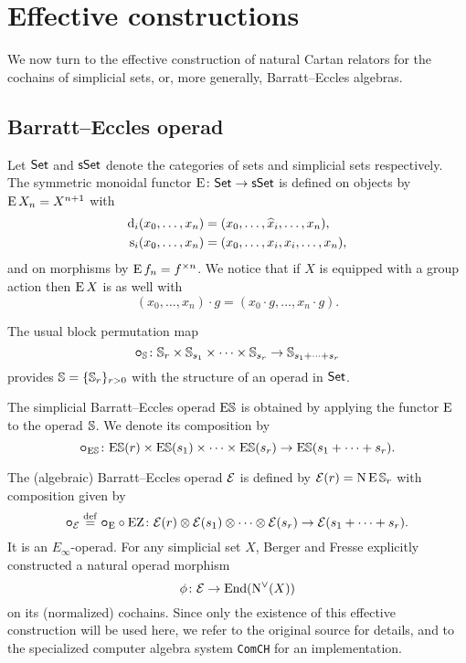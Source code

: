 
\section{Effective constructions}\label{s:effective}

We now turn to the effective construction of natural Cartan relators for the cochains of simplicial sets, or, more generally, Barratt--Eccles algebras.

\subsection{Barratt--Eccles operad}

Let $\mathsf{Set}$ and $\mathsf{sSet}$ denote the categories of sets and simplicial sets respectively.
The symmetric monoidal functor $\operatorname{E} \colon \mathsf{Set} \to \mathsf{sSet}$ is defined on objects by $\operatorname{E} X_n = X^{n+1}$ with
\[
\begin{split}
	\operatorname{d}_i(x_0,\dots,x_n) &= (x_0,\dots,\widehat{x}_i,\dots,x_n), \\
	\operatorname{s}_i(x_0,\dots,x_n) &= (x_0, \dots, x_i, x_i, \dots, x_n),
\end{split}
\]
and on morphisms by $\operatorname{E} f_n = f^{\times n}$.
We notice that if $X$ is equipped with a group action then $\operatorname{E} X$ is as well with
\[
(x_0,\dots,x_n) \cdot g = (x_0 \cdot g, \dots, x_n \cdot g).
\]

The usual block permutation map
\[
\bm{\circ}_{\mathbb{S}} \colon \mathbb{S}_r \times \mathbb{S}_{s_1} \times \cdots \times \mathbb{S}_{s_r} \to \mathbb{S}_{s_1+\dots+s_r}
\]
provides $\mathbb{S} = \{\mathbb{S}_r\}_{r>0}$ with the structure of an operad in $\mathsf{Set}$.

The simplicial Barratt--Eccles operad $\mathrm{E}\mathbb{S}$ is obtained by applying the functor $\operatorname{E}$ to the operad $\mathbb{S}$.
We denote its composition by
\[
\bm{\circ}_{\mathrm{E}\mathbb{S}} \colon
\mathrm{E}\mathbb{S}(r) \times \mathrm{E}\mathbb{S}(s_1) \times\dots\times \mathrm{E}\mathbb{S}(s_r) \to
\mathrm{E}\mathbb{S}(s_1+\dots+s_r).
\]

The (algebraic) Barratt--Eccles operad $\mathcal{E}$ is defined by $\mathcal{E}(r) = \operatorname{N}\operatorname{E}\mathbb{S}_r$ with composition given by
\[
\bm{\circ}_{\mathcal{E}} \stackrel{\mathrm{def}}{=} \bm{\circ}_{\operatorname{E}} \circ \operatorname{EZ} \colon \mathcal{E}(r) \otimes \mathcal{E}(s_1) \otimes\dotsb\otimes \mathcal{E}(s_r) \to \mathcal{E}(s_1+\dots+s_r).
\]
It is an $E_\infty$-operad.
For any simplicial set $X$, Berger and Fresse \cite{berger2004combinatorial} explicitly constructed a natural operad morphism
\[
\phi \colon \mathcal{E} \to \mathrm{End}(\operatorname{N^{\vee}}(X))
\]
on its (normalized) cochains.
Since only the existence of this effective construction will be used here, we refer to the original source for details, and to the specialized computer algebra system \texttt{ComCH} for an implementation.

